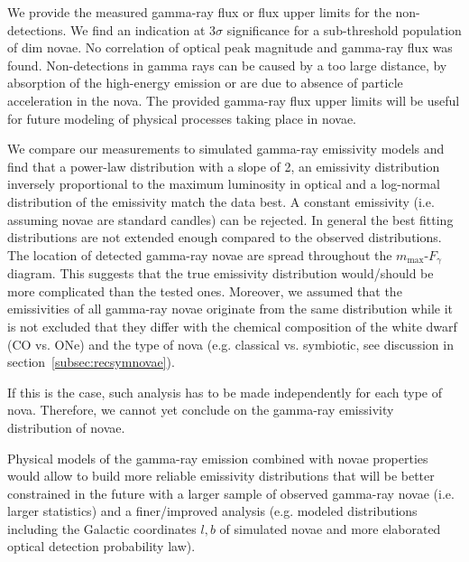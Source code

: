 \documentclass{aa} %
\begin{document}
We provide the measured gamma-ray flux or flux upper limits for the non-detections. We find an indication at $3\sigma$ significance for a sub-threshold population of dim novae. No correlation of optical peak magnitude and gamma-ray flux was found. Non-detections in gamma rays can be caused by a too large distance, by absorption of the high-energy emission or are due to absence of particle acceleration in the nova. The provided gamma-ray flux upper limits will be useful for future modeling of physical processes taking place in novae.

We compare our measurements to simulated gamma-ray emissivity models and find that a power-law distribution with a slope of 2, an emissivity distribution inversely proportional to the maximum luminosity in optical and a log-normal distribution of the emissivity match the data best. A constant emissivity (i.e. assuming novae are standard candles) can be rejected. In general the best fitting distributions are not extended enough compared to the observed distributions. The location of detected gamma-ray novae are spread throughout the $m_{\textrm{max}}$-$F_{\gamma}$ diagram. This suggests that the true emissivity distribution would/should be more complicated than the tested ones. 
Moreover, we assumed that the emissivities of all gamma-ray novae originate from the same distribution while it is not excluded that they differ with the chemical composition of the white dwarf (CO vs. ONe) and the type of nova (e.g. classical vs. symbiotic, see discussion in section~\ref{subsec:recsymnovae}).

If this is the case, such analysis has to be made independently for each type of nova. Therefore, we cannot yet conclude on the gamma-ray emissivity distribution of novae.

Physical models of the gamma-ray emission combined with novae properties would allow to build more reliable emissivity distributions that will be better constrained in the future with a larger sample of observed gamma-ray novae (i.e. larger statistics) and a finer/improved analysis (e.g. modeled distributions including the Galactic coordinates $l, b$ of simulated novae and more elaborated optical detection probability law). 
\end{document}
